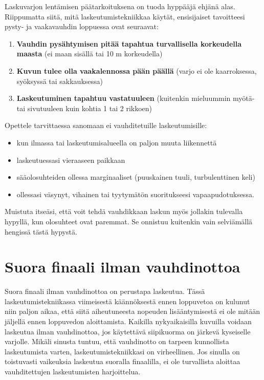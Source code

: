 
Laskuvarjon lentämisen päätarkoituksena on tuoda hyppääjä ehjänä alas. Riippumatta siitä, mitä laskeutumistekniikkaa käytät, ensisijaiset tavoitteesi pysty- ja vaakavauhdin loppuessa ovat seuraavat: 

\begin{enumerate}[label=\bfseries \arabic*)]
\item  \textbf{Vauhdin pysähtymisen pitää tapahtua turvallisella korkeudella maasta} (ei maan sisällä tai 10 m korkeudella) 
\item  \textbf{Kuvun tulee olla vaakalennossa pään päällä} (varjo ei ole kaarroksessa, syöksyssä tai sakkauksessa) 
\item  \textbf{Laskeutuminen tapahtuu vastatuuleen} (kuitenkin mieluummin myötä- tai sivutuuleen kuin kohtia 1 tai 2 rikkoen) 
\end{enumerate}

Opettele tarvittaessa sanomaan ei vauhditetuille laskeutumisille: 

\begin{itemize}
\item  kun ilmassa tai laskeutumisalueella on paljon muuta liikennettä 
\item  laskeutuessasi vieraaseen paikkaan 
\item  sääolosuhteiden ollessa marginaaliset (puuskainen tuuli, turbulenttinen keli) 
\item  ollessasi väsynyt, vihainen tai tyytymätön suoritukseesi vapaapudotuksessa.  
\end{itemize}

Muistuta itseäsi, että voit tehdä vauhdikkaan laskun myös jollakin tulevalla hypyllä, kun olosuhteet ovat paremmat. Se onnistuu kuitenkin vain selviämällä hengissä tästä hypystä.  

\section{ Suora finaali ilman vauhdinottoa }
\label{laskeutumistekniikat-suora-finaali-ilman-vauhdinottoa}


Suora finaali ilman vauhdinottoa on perustapa laskeutua. Tässä laskeutumistekniikassa viimeisestä käännöksestä ennen loppuvetoa on kulunut niin paljon aikaa, että siitä aiheutuneesta nopeuden lisääntymisestä ei ole mitään jäljellä ennen loppuvedon aloittamista. Kaikilla nykyaikaisilla kuvuilla voidaan laskeutua ilman vauhdinottoa, jos käytettävä siipikuorma on järkevä kyseiselle varjolle. Mikäli sinusta tuntuu, että vauhdinotto on tarpeen kunnollista laskeutumista varten, laskeutumistekniikkasi on virheellinen. Jos sinulla on toistuvasti vaikeuksia laskeutua suoralla finaalilla, ei ole turvallista aloittaa vauhditettujen laskeutumisten harjoittelua.  


